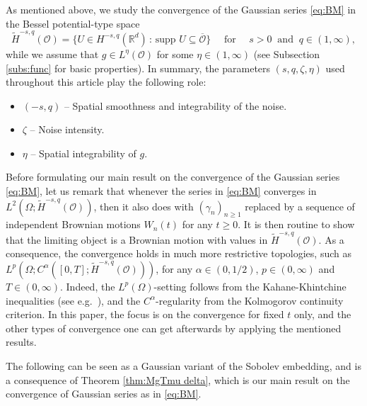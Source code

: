 \documentclass[reqno]{amsart}
\theoremstyle{plain}
\theoremstyle{remark}
\theoremstyle{plain}
\numberwithin{equation}{section}
\newcommand\cO{\mathcal{O}}
\def\R{{\mathbb R}}
\newcommand{\wt}{\widetilde}
\newcommand{\1}{\one}
\newcommand{\supp}{\mathrm{supp}\,}
\begin{document}
As mentioned above, we study the convergence of the Gaussian series \eqref{eq:BM} in the Bessel potential-type space
$$
\wt{H}^{-s,q}(\cO)=\big\{U\in H^{-s,q}(\R^d)\,:\, \supp\, U \subseteq \overline{\cO} \big\}\quad \text{ for }\quad s>0 \  \text{ and }\  q\in (1,\infty),
$$
while we assume that $g\in L^\eta(\cO)$ for some $\eta\in (1,\infty)$ (see Subsection \ref{subs:func} for basic properties). 
In summary, the parameters $(s,q,\zeta,\eta)$ used throughout this article play the following role:
\begin{itemize}
\item $(-s,q)$ -- Spatial smoothness and integrability of the noise.
\item $\zeta$ -- Noise intensity.
\item $\eta$ -- Spatial integrability of  $g$.
\end{itemize}


Before formulating our main result on the convergence of the Gaussian series \eqref{eq:BM}, let us remark that whenever the series in \eqref{eq:BM} converges in $L^2(\Omega;\wt{H}^{-s,q}(\cO))$, then it also does with $(\gamma_n)_{n\geq 1}$ replaced by a sequence of independent Brownian motions $W_n(t)$ for any $t\geq 0$.
%
It is then routine to show that the limiting object is a Brownian motion with values in $\wt{H}^{-s,q}(\cO)$. As a consequence, the convergence holds in much more restrictive topologies, such as $L^p(\Omega;C^\alpha([0,T]; \wt{H}^{-s,q}(\cO)))$, for any $\alpha\in (0,1/2)$, $p\in (0,\infty)$ and $T\in (0,\infty)$. Indeed, the $L^p(\Omega)$-setting follows from the Kahane-Khintchine inequalities (see e.g.\ \cite[Section 6.2b]{HNVW2}), and the $C^\alpha$-regularity from the Kolmogorov continuity criterion. In this paper, the focus is on the convergence for fixed $t$ only, and the other types of convergence one can get afterwards by applying the mentioned results. 

The following can be seen as a Gaussian variant of the Sobolev embedding, and is a consequence of Theorem \ref{thm:MgTmu delta}, which is our main result on the convergence of Gaussian series as in \eqref{eq:BM}.
\end{document}
